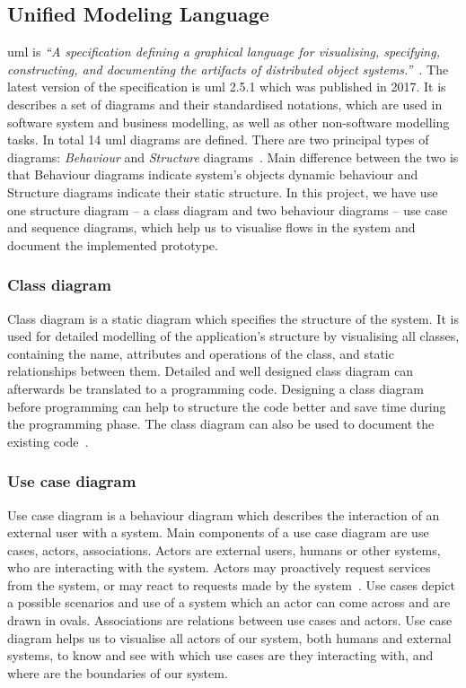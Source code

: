 \subsection{Unified Modeling Language}
\acrfull{uml} is \textit{``A specification defining a graphical language for visualising, specifying, constructing, and documenting the artifacts of distributed object systems.''}~\cite{OMG2017About2.5.1}. The latest version of the specification is \acrshort{uml} 2.5.1 which was published in 2017. It is describes a set of diagrams and their standardised notations, which are used in software system and business modelling, as well as other non-software modelling tasks. In total 14 \acrshort{uml} diagrams are defined. There are two principal types of diagrams: \textit{Behaviour} and \textit{Structure} diagrams~\cite{ObjectManagementGroup2015Unified2.5}. Main difference between the two is that Behaviour diagrams indicate system's objects dynamic behaviour and Structure diagrams indicate their static structure. In this project, we have use one structure diagram -- a class diagram and two behaviour diagrams -- use case and sequence diagrams, which help us to visualise flows in the system and document the implemented prototype.

\subsubsection{Class diagram}
Class diagram is a static diagram which specifies the structure of the system. It is used for detailed modelling of the application's structure by visualising all classes, containing the name, attributes and operations of the class, and static relationships between them. Detailed and well designed class diagram can afterwards be translated to a programming code. Designing a class diagram before programming can help to structure the code better and save time during the programming phase. The class diagram can also be used to document the existing code~\cite{Seidl2015UMLModeling}.

\subsubsection{Use case diagram}
Use case diagram is a behaviour diagram which describes the interaction of an external user with a system. Main components of a use case diagram are use cases, actors, associations. Actors are external users, humans or other systems, who are interacting with the system. Actors may proactively request services from the system, or may react to requests made by the system~\cite[p.~28]{Cockburn2000WritingCases}. Use cases depict a possible scenarios and use of a system which an actor can come across and are drawn in ovals. Associations are relations between use cases and actors. Use case diagram helps us to visualise all actors of our system, both humans and external systems, to know and see with which use cases are they interacting with, and where are the boundaries of our system.

